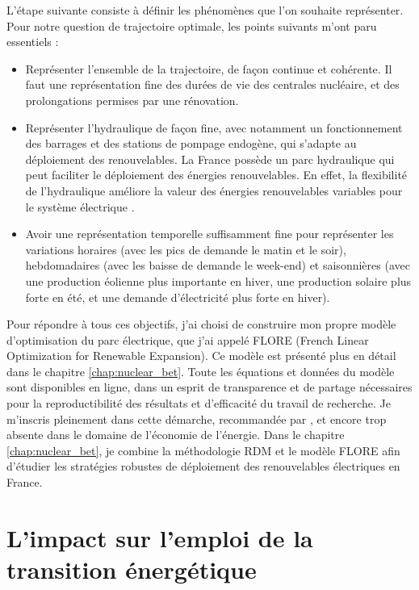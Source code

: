 L’étape suivante consiste à définir les phénomènes que l’on souhaite représenter. Pour notre question de trajectoire optimale, les points suivants m’ont paru essentiels :
\begin{itemize}
	\item Représenter l’ensemble de la trajectoire, de façon continue et cohérente. Il faut une représentation fine des durées de vie des centrales nucléaire, et des prolongations permises par une rénovation.
	\item Représenter l’hydraulique de façon fine, avec notamment un fonctionnement des barrages et des stations de pompage endogène, qui s’adapte au déploiement des renouvelables. La France possède un parc hydraulique qui peut faciliter le déploiement des énergies renouvelables. En effet, la flexibilité de l’hydraulique améliore la valeur des énergies renouvelables variables pour le système électrique \citep{Hirth2016a}.
	\item Avoir une représentation temporelle suffisamment fine pour représenter les variations horaires (avec les pics de demande le matin et le soir), hebdomadaires (avec les baisse de demande le week-end) et saisonnières (avec une production éolienne plus importante en hiver, une production solaire plus forte en été, et une demande d’électricité plus forte en hiver).
\end{itemize}

Pour répondre à tous ces objectifs, j’ai choisi de construire mon propre modèle d’optimisation du parc électrique, que j’ai appelé FLORE (French Linear Optimization for Renewable Expansion). Ce modèle est présenté plus en détail dans le chapitre \ref{chap:nuclear_bet}.
Toute les équations et données du modèle sont disponibles en ligne, dans un esprit de transparence et de partage nécessaires pour la reproductibilité des résultats et d’efficacité du travail de recherche. Je m’inscris pleinement dans cette démarche, recommandée par \citet{Pfenninger2017}, et encore trop absente dans le domaine de l’économie de l’énergie.
Dans le chapitre \ref{chap:nuclear_bet}, je combine la méthodologie RDM et le modèle FLORE afin d’étudier les stratégies robustes de déploiement des renouvelables électriques en France.

\section{L’impact sur l’emploi de la transition énergétique}
\label{sec:intro_emploi}

